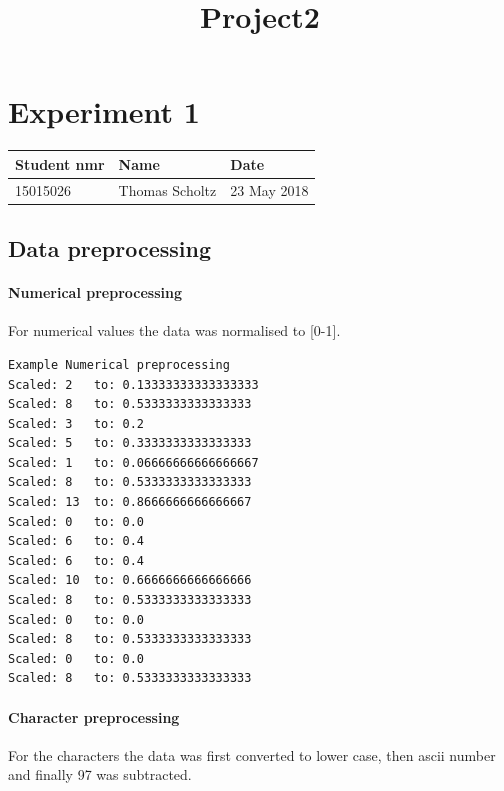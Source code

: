 \documentclass[11pt]{article}
\title{Project2}
\begin{document}
    
    
    \maketitle
    
    

    
    \hypertarget{experiment-1}{%
\section{Experiment 1}\label{experiment-1}}

\begin{longtable}[]{@{}lll@{}}
\toprule
Student nmr & Name & Date\tabularnewline
\midrule
\endhead
15015026 & Thomas Scholtz & 23 May 2018\tabularnewline
\bottomrule
\end{longtable}

    \hypertarget{data-preprocessing}{%
\subsection{Data preprocessing}\label{data-preprocessing}}

\hypertarget{numerical-preprocessing}{%
\paragraph{Numerical preprocessing}\label{numerical-preprocessing}}

For numerical values the data was normalised to {[}0-1{]}.

\begin{verbatim}
Example Numerical preprocessing
Scaled: 2   to: 0.13333333333333333
Scaled: 8   to: 0.5333333333333333
Scaled: 3   to: 0.2
Scaled: 5   to: 0.3333333333333333
Scaled: 1   to: 0.06666666666666667
Scaled: 8   to: 0.5333333333333333
Scaled: 13  to: 0.8666666666666667
Scaled: 0   to: 0.0
Scaled: 6   to: 0.4
Scaled: 6   to: 0.4
Scaled: 10  to: 0.6666666666666666
Scaled: 8   to: 0.5333333333333333
Scaled: 0   to: 0.0
Scaled: 8   to: 0.5333333333333333
Scaled: 0   to: 0.0
Scaled: 8   to: 0.5333333333333333
\end{verbatim}

\hypertarget{character-preprocessing}{%
\paragraph{Character preprocessing}\label{character-preprocessing}}

For the characters the data was first converted to lower case, then
ascii number and finally 97 was subtracted.
\end{document}
